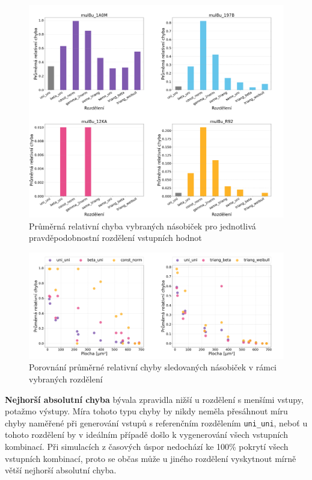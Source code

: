 \begin{figure}[H]
    \centering
    \includegraphics[width=\textwidth]{obrazky-figures/metrics_mean_relative_error.png}
    \caption{Průměrná relativní chyba vybraných násobiček pro jednotlivá pravděpodobnostní rozdělení vstupních hodnot}
    \label{fig:metrics_mean_relative_error}
\end{figure}

\begin{figure}[H]
    \centering
    \includegraphics[width=\textwidth]{obrazky-figures/scatter_mean_relative_error.png}
    \caption{Porovnání průměrné relativní chyby sledovaných násobiček v rámci vybraných rozdělení}
    \label{fig:scatter_mean_relative_error}
\end{figure}

\textbf{Nejhorší absolutní chyba} bývala zpravidla nižší u rozdělení s menšími vstupy, potažmo výstupy. Míra tohoto typu chyby by nikdy neměla přesáhnout míru chyby naměřené při generování vstupů s referenčním rozdělením \texttt{uni\_uni}, neboť u tohoto rozdělení by v ideálním případě došlo k vygenerování všech vstupních kombinací. Při simulacích z časových úspor nedochází ke 100\% pokrytí všech vstupních kombinací, proto se občas může u jiného rozdělení vyskytnout mírně větší nejhorší absolutní chyba.

